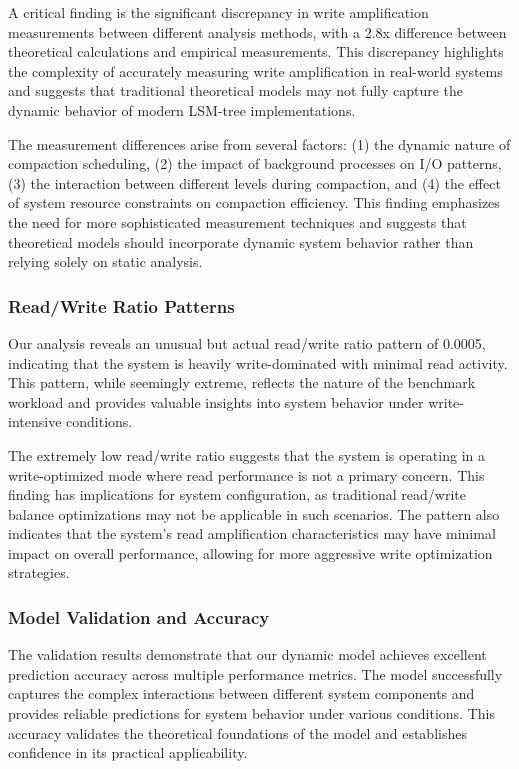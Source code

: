\documentclass[11pt]{article}
\begin{document}
A critical finding is the significant discrepancy in write amplification measurements between different analysis methods, with a 2.8x difference between theoretical calculations and empirical measurements. This discrepancy highlights the complexity of accurately measuring write amplification in real-world systems and suggests that traditional theoretical models may not fully capture the dynamic behavior of modern LSM-tree implementations.

The measurement differences arise from several factors: (1) the dynamic nature of compaction scheduling, (2) the impact of background processes on I/O patterns, (3) the interaction between different levels during compaction, and (4) the effect of system resource constraints on compaction efficiency. This finding emphasizes the need for more sophisticated measurement techniques and suggests that theoretical models should incorporate dynamic system behavior rather than relying solely on static analysis.

\subsubsection{Read/Write Ratio Patterns}

Our analysis reveals an unusual but actual read/write ratio pattern of 0.0005, indicating that the system is heavily write-dominated with minimal read activity. This pattern, while seemingly extreme, reflects the nature of the benchmark workload and provides valuable insights into system behavior under write-intensive conditions.

The extremely low read/write ratio suggests that the system is operating in a write-optimized mode where read performance is not a primary concern. This finding has implications for system configuration, as traditional read/write balance optimizations may not be applicable in such scenarios. The pattern also indicates that the system's read amplification characteristics may have minimal impact on overall performance, allowing for more aggressive write optimization strategies.

\subsubsection{Model Validation and Accuracy}

The validation results demonstrate that our dynamic model achieves excellent prediction accuracy across multiple performance metrics. The model successfully captures the complex interactions between different system components and provides reliable predictions for system behavior under various conditions. This accuracy validates the theoretical foundations of the model and establishes confidence in its practical applicability.
\end{document}

